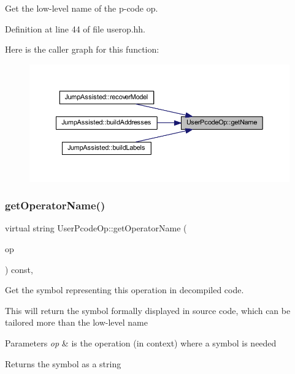 Get the low-\/level name of the p-\/code op. 



Definition at line 44 of file userop.\+hh.

Here is the caller graph for this function\+:
\nopagebreak
\begin{figure}[H]
\begin{center}
\leavevmode
\includegraphics[width=350pt]{class_user_pcode_op_a580a157f5fa5a71f323f5fd59627d5c9_icgraph}
\end{center}
\end{figure}
\mbox{\label{class_user_pcode_op_a7529472e93f9077d5bfdb9cc1142bfbb}} 
\subsubsection{\texorpdfstring{getOperatorName()}{getOperatorName()}}
{\footnotesize\ttfamily virtual string User\+Pcode\+Op\+::get\+Operator\+Name (\begin{DoxyParamCaption}\item[{const \mbox{\hyperlink{class_pcode_op}{Pcode\+Op}} $\ast$}]{op }\end{DoxyParamCaption}) const\hspace{0.3cm}{\ttfamily [inline]}, {\ttfamily [virtual]}}



Get the symbol representing this operation in decompiled code. 

This will return the symbol formally displayed in source code, which can be tailored more than the low-\/level name 
\begin{DoxyParams}{Parameters}
{\em op} & is the operation (in context) where a symbol is needed \\
\hline
\end{DoxyParams}
\begin{DoxyReturn}{Returns}
the symbol as a string 
\end{DoxyReturn}



